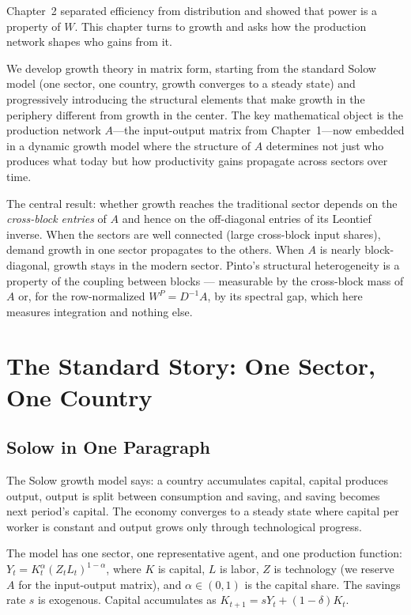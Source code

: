 \documentclass[../structural_economics_book.tex]{subfiles}
\begin{document}
Chapter~2 separated efficiency from distribution and showed that power is a property of $W$. This chapter turns to growth and asks how the production network shapes who gains from it.

We develop growth theory in matrix form, starting from the standard Solow model (one sector, one country, growth converges to a steady state) and progressively introducing the structural elements that make growth in the periphery different from growth in the center. The key mathematical object is the production network $A$---the input-output matrix from Chapter~1---now embedded in a dynamic growth model where the structure of $A$ determines not just who produces what today but how productivity gains propagate across sectors over time.

The central result: whether growth reaches the traditional sector depends on the \textit{cross-block entries} of $A$ and hence on the off-diagonal entries of its Leontief inverse. When the sectors are well connected (large cross-block input shares), demand growth in one sector propagates to the others. When $A$ is nearly block-diagonal, growth stays in the modern sector. Pinto's structural heterogeneity is a property of the coupling between blocks --- measurable by the cross-block mass of $A$ or, for the row-normalized $W^P = D^{-1}A$, by its spectral gap, which here measures integration and nothing else.


\section{The Standard Story: One Sector, One Country}
\label{ch03:sec:solow}

\subsection{Solow in One Paragraph}

The Solow growth model says: a country accumulates capital, capital produces output, output is split between consumption and saving, and saving becomes next period's capital. The economy converges to a steady state where capital per worker is constant and output grows only through technological progress.

The model has one sector, one representative agent, and one production function: $Y_t = K_t^\alpha (Z_t L_t)^{1-\alpha}$, where $K$ is capital, $L$ is labor, $Z$ is technology (we reserve $A$ for the input-output matrix), and $\alpha \in (0,1)$ is the capital share. The savings rate $s$ is exogenous. Capital accumulates as $K_{t+1} = sY_t + (1-\delta)K_t$.
\end{document}
